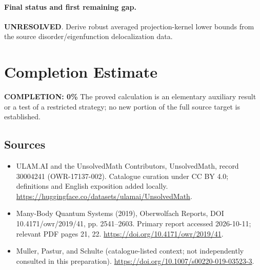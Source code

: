 \documentclass[11pt]{article}
\begin{document}
\paragraph{Final status and first remaining gap.}
\textbf{UNRESOLVED}. Derive robust averaged projection-kernel lower bounds from the source disorder/eigenfunction delocalization data.

\section{Completion Estimate}
\noindent\textbf{COMPLETION: 0\%}
The proved calculation is an elementary auxiliary result or a test of a restricted strategy; no new portion of the full source target is established.

\subsection{Sources}
\begin{itemize}
\item[\hypertarget{source:30004241:1}{S1}] ULAM.AI and the UnsolvedMath Contributors, UnsolvedMath, record 30004241 (OWR-17137-002). Catalogue curation under CC BY 4.0; definitions and English exposition added locally.
\url{https://huggingface.co/datasets/ulamai/UnsolvedMath}.
\item[\hypertarget{source:30004241:2}{S2}] Many-Body Quantum Systems (2019), Oberwolfach Reports, DOI 10.4171/owr/2019/41, pp. 2541--2603. Primary report accessed 2026-10-11; relevant PDF pages 21, 22.
\url{https://doi.org/10.4171/owr/2019/41}.
\item[\hypertarget{source:30004241:3}{S3}] Muller, Pastur, and Schulte (catalogue-listed context; not independently consulted in this preparation).
\url{https://doi.org/10.1007/s00220-019-03523-3}.
\end{itemize}
\label{end:30004241}
\end{document}
